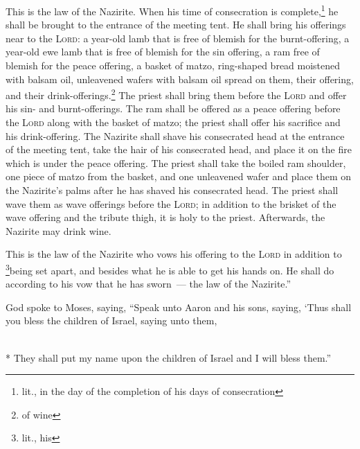 \begin{inparaenum}
     This is the law of the Nazirite. When his time of consecration is complete,\footnote{lit., in the day of the completion of his days of consecration} he shall be brought to the entrance of the meeting tent.%
     He shall bring his offerings near to the \textsc{Lord}: a year-old lamb that is free of blemish for the burnt-offering, a year-old ewe lamb that is free of blemish for the sin offering, a ram free of blemish for the peace offering,%
     a basket of matzo, ring-shaped bread moistened with balsam oil, unleavened wafers with balsam oil spread on them, their offering, and their drink-offerings.\footnote{of wine}%
     The priest shall bring them before the \textsc{Lord} and offer his sin- and burnt-offerings.%
     The ram shall be offered as a peace offering before the \textsc{Lord} along with the basket of matzo; the priest shall offer his sacrifice and his drink-offering.%
     The Nazirite shall shave his consecrated head at the entrance of the meeting tent, take the hair of his consecrated head, and place it on the fire which is under the peace offering.%
     The priest shall take the boiled ram shoulder, one piece of matzo from the basket, and one unleavened wafer and place them on the Nazirite's palms after he has shaved his consecrated head.%
     The priest shall wave them as wave offerings before the \textsc{Lord}; in addition to the brisket of the wave offering and the tribute thigh, it is holy to the priest. Afterwards, the Nazirite may drink wine.%
    
     This is the law of the Nazirite who vows his offering to the \textsc{Lord} in addition to \footnote{lit., his}being set apart, and besides what he is able to get his hands on. He shall do according to his vow that he has sworn~--- the law of the Nazirite.''%
    
     God spoke to Moses, saying,%
     ``Speak unto Aaron and his sons, saying, `Thus shall you bless the children of Israel, saying unto them,%
    
    
    
    \\*%
     They shall put my name upon the children of Israel and I will bless them.''%
\end{inparaenum}
